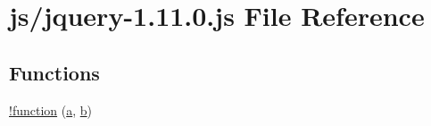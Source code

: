 \hypertarget{jquery-1_811_80_8js}{\section{js/jquery-\/1.11.0.js File Reference}
\label{jquery-1_811_80_8js}
}
\subsection*{Functions}
\begin{DoxyCompactItemize}
\item 
\hyperlink{jquery-1_811_80_8js_a43f0b96ea8ec44ca20ba86809a785614}{!function} (\hyperlink{bootstrap_8min_8js_a1f5870dcf487187f13d5fd328ed9e6e7}{a}, \hyperlink{bootstrap_8min_8js_a398bb8542498d1b14178b02b99df309b}{b})
\item 

\end{DoxyCompactItemize}
